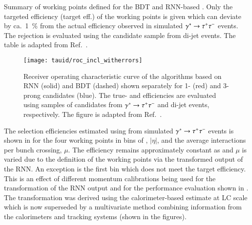 \begin{table}[htbp]
  \centering

  \caption{Summary of working points defined for the BDT and RNN-based
    \tauid. Only the targeted \truetauhadvis efficiency (target
    \truetauhadvis eff.) of the working points is given which can
    deviate by ca.\ \SI{1}{\percent} from the actual efficiency
    observed in simulated $\gamma^{*} \to \tau^{+} \tau^{-}$ events. The
    \faketauhadvis rejection is evaluated using the \tauhadvis
    candidate sample from di-jet events. The table is adapted from
    Ref.~\cite{ATL-PHYS-PUB-2019-033}.}%
  \label{tab:rnn_wps}

  
\end{table}

\begin{figure}[htbp]
  \centering

  \texttt{[image: tauid/roc\_incl\_witherrors]}

  \caption{Receiver operating characteristic curve of the \tauid
    algorithms based on RNN (solid) and BDT (dashed) shown separately
    for 1- (red) and 3-prong candidates (blue). The true- and
    \faketauhadvis efficiencies are evaluated using samples of
    \tauhadvis candidates from $\gamma^{*} \to \tau^{+} \tau^{-}$ and di-jet
    events, respectively.  The figure is adapted from
    Ref.~\cite{ATL-PHYS-PUB-2019-033}.}%
  \label{fig:tauid_rnn_bdt_roc_comparison}
\end{figure}

The \truetauhadvis selection efficiencies estimated using \tauhadvis
from simulated $\gamma^{*} \to \tau^{+} \tau^{-}$ events is shown in
 for the four working points in bins of
\tauhadvis \pT, \tauhadvis $|\eta|$, and the average interactions per
bunch crossing, $\mu$. The efficiency remains approximately constant
as \tauhadvis \pT and $\mu$ is varied due to the definition of the
working points via the transformed output of the RNN. An exception is
the first \tauhadvis \pT bin which does not meet the target
efficiency. This is an effect of different \tauhadvis momentum
calibrations being used for the transformation of the RNN output and
for the performance evaluation shown in
. The
transformation was derived using the calorimeter-based \tauhadvis \pT
estimate at LC scale which is now superseded by a multivariate method
combining information from the calorimeters and tracking systems
(shown in the figures).

